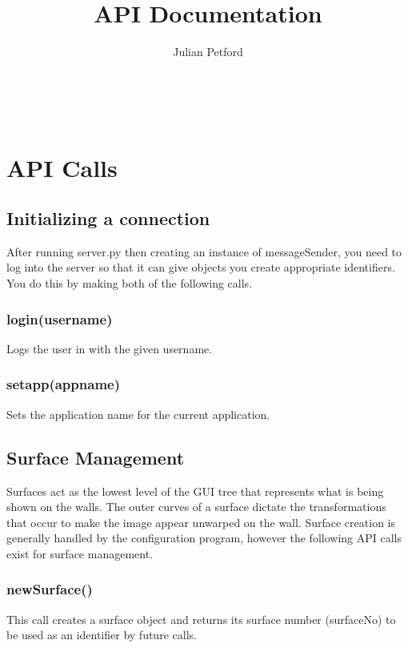 \documentclass{acm_proc_article-sp}
\begin{document}

\title{API Documentation}

\author{
Julian Petford\\
       \\
       \\
       \\
}

\maketitle

\section{API Calls}
\subsection{Initializing a connection}
After running server.py then creating an instance of messageSender, you need to log into the server so that it can give objects you create appropriate identifiers. You do this by making both of the following calls.
\subsubsection{login(username)}
Logs the user in with the given username.
\subsubsection{setapp(appname)}
Sets the application name for the current application.

\subsection{Surface Management}
Surfaces act as the lowest level of the GUI tree that represents what is being shown on the walls. The outer curves of a surface dictate the transformations that occur to make the image appear unwarped on the wall. Surface creation is generally handled by the configuration program, however the following API calls exist for surface management.
\subsubsection{newSurface()}
This call creates a surface object and returns its surface number (surfaceNo) to be used as an identifier by future calls.
\end{document}
